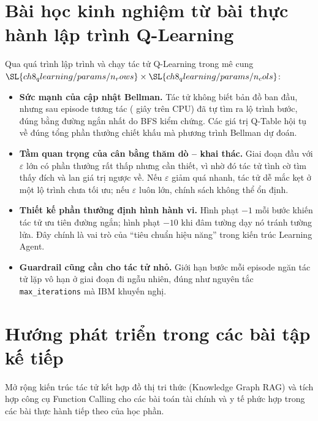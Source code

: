 \section{Bài học kinh nghiệm từ bài thực hành lập trình Q-Learning}
Qua quá trình lập trình và chạy tác tử Q-Learning trong mê cung
$\SL{ch8_qlearning/params/n_rows} \times \SL{ch8_qlearning/params/n_cols}$:
\begin{itemize}
  \item \textbf{Sức mạnh của cập nhật Bellman.} Tác tử không biết bản đồ ban đầu, nhưng sau
         episode tương tác ( giây trên CPU) đã tự tìm
        ra lộ trình  bước, đúng bằng đường ngắn nhất do BFS kiểm chứng. Các giá trị
        Q-Table hội tụ về đúng tổng phần thưởng chiết khấu mà phương trình Bellman dự đoán.
  \item \textbf{Tầm quan trọng của cân bằng thăm dò -- khai thác.} Giai đoạn đầu với $\varepsilon$ lớn có phần thưởng
        rất thấp nhưng cần thiết, vì nhờ đó tác tử tình cờ tìm thấy đích và lan giá trị ngược về. Nếu $\varepsilon$ giảm
        quá nhanh, tác tử dễ mắc kẹt ở một lộ trình chưa tối ưu; nếu $\varepsilon$ luôn lớn, chính sách không thể ổn
        định.
  \item \textbf{Thiết kế phần thưởng định hình hành vi.} Hình phạt $-1$ mỗi bước khiến tác tử ưu tiên đường ngắn; hình
        phạt $-10$ khi đâm tường dạy nó tránh tường lửa. Đây chính là vai trò của ``tiêu chuẩn hiệu năng'' trong kiến
        trúc Learning Agent.
  \item \textbf{Guardrail cũng cần cho tác tử nhỏ.} Giới hạn  bước mỗi episode ngăn
        tác tử lặp vô hạn ở giai đoạn đi ngẫu nhiên, đúng như nguyên tắc \texttt{max\_iterations} mà IBM khuyến nghị.
\end{itemize}

\section{Hướng phát triển trong các bài tập kế tiếp}
Mở rộng kiến trúc tác tử kết hợp đồ thị tri thức (Knowledge Graph RAG) và tích hợp công cụ Function Calling cho các bài
toán tài chính và y tế phức hợp trong các bài thực hành tiếp theo của học phần.
